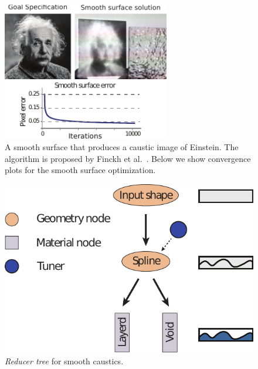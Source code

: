 \begin{figure}[h]
\centering
\includegraphics[width=0.65\textwidth]{figure/spline.pdf}
\caption {A smooth surface that produces a caustic image of Einstein.
The algorithm is proposed by Finckh et al.~.
Below we show convergence plots for the smooth surface optimization.
}
\label{fig:spline}
\end{figure}

\begin{figure}[h]
\centering
\includegraphics[scale=0.7]{figure/treeSpline.pdf}
\caption {\emph{Reducer tree} for smooth caustics.
}
\label{fig:treeSpline}
\end{figure}

